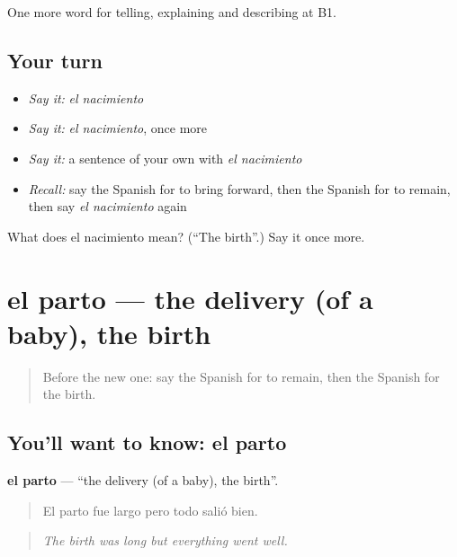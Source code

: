 \begin{grammarlens}[title={What you've built}]
One more word for telling, explaining and describing at B1.
\end{grammarlens}

\subsection*{Your turn}
\begin{itemize}
\raggedright
  \item \emph{Say it:} \emph{el nacimiento}
  \item \emph{Say it:} \emph{el nacimiento}, once more
  \item \emph{Say it:} a sentence of your own with \emph{el nacimiento}
  \item \emph{Recall:} say the Spanish for to bring forward, then the Spanish for to remain, then say \emph{el nacimiento} again
\end{itemize}

\begin{tcolorbox}[breakable,colback=teal!4,colframe=teal!35!black,title={Before you move on}]
What does el nacimiento mean? (\textquotedblleft{}The birth\textquotedblright{}.) Say it once more.
\end{tcolorbox}
\section[el parto]{el parto — the delivery (of a baby), the birth}

\label{lesson:ES-C544-parto}



\begin{quote}
Before the new one: say the Spanish for to remain, then the Spanish for the birth.
\end{quote}

\subsection*{You'll want to know: el parto}
\textbf{el parto} — \textquotedblleft{}the delivery (of a baby), the birth\textquotedblright{}.

\begin{quote}
El parto fue largo pero todo salió bien.
\end{quote}

\begin{quote}
\emph{The birth was long but everything went well.}
\end{quote}

